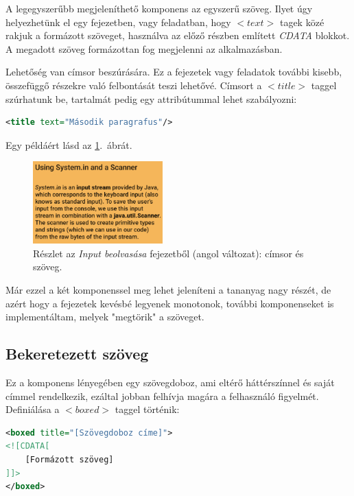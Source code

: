 \documentclass[12pt,a4paper]{article}
\begin{document}
	A legegyszerűbb megjeleníthető komponens az egyszerű szöveg. Ilyet úgy helyezhetünk el egy fejezetben, vagy feladatban, hogy $<text>$ tagek közé rakjuk a formázott szöveget, használva az előző részben említett \textit{CDATA} blokkot. A megadott szöveg formázottan fog megjelenni az alkalmazásban.
	
	Lehetőség van címsor beszúrására. Ez a fejezetek vagy feladatok további kisebb, összefüggő részekre való felbontását teszi lehetővé. Címsort a $<title>$ taggel szúrhatunk be, tartalmát pedig egy attribútummal lehet szabályozni:
	
	\bigskip
	\begin{lstlisting}[language=XML]
<title text="Második paragrafus"/>
	\end{lstlisting}
	\bigskip
	
	Egy példáért lásd az \ref{title_component_figure}.\ ábrát.
	
	\begin{figure}[h!]
		\centering
		\includegraphics[width=5cm]{title_text_component}
		\caption{Részlet az \textit{Input beolvasása} fejezetből (angol változat): címsor és szöveg.}
		\label{title_component_figure}
	\end{figure}
	
	Már ezzel a két komponenssel meg lehet jeleníteni a tananyag nagy részét, de azért hogy a fejezetek kevésbé legyenek monotonok, további komponenseket is implementáltam, melyek "megtörik" a szöveget. 
	
	\subsection{Bekeretezett szöveg}
	
	Ez a komponens lényegében egy szövegdoboz, ami eltérő háttérszínnel és saját címmel rendelkezik, ezáltal jobban felhívja magára a felhasználó figyelmét. Definiálása a $<boxed>$ taggel történik:
	
	\bigskip
	\begin{lstlisting}[language=XML]
<boxed title="[Szövegdoboz címe]">
<![CDATA[
	[Formázott szöveg]
]]>
</boxed>	
	\end{lstlisting}
	\bigskip
	
\end{document}
